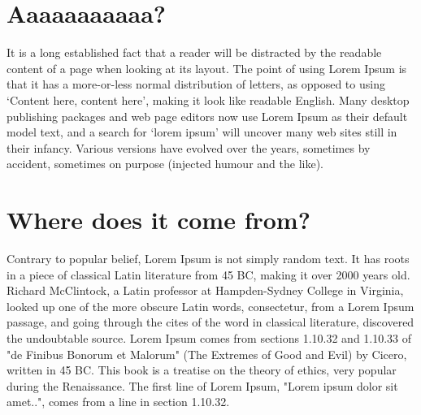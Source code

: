 \nomenclature[g-p]{$\pi$}{ $\simeq 3.14\ldots$}                                             %


\section{Aaaaaaaaaaa?} %


It is a long established fact that a reader will be distracted by the readable content of a page when looking at its layout. The point of using Lorem Ipsum is that it has a more-or-less normal distribution of letters, as opposed to using `Content here, content here', making it look like readable English. Many desktop publishing packages and web page editors now use Lorem Ipsum as their default model text, and a search for `lorem ipsum' will uncover many web sites still in their infancy. Various versions have evolved over the years, sometimes by accident, sometimes on purpose (injected humour and the like).

\section{Where does it come from?}  %
\label{section1.3}

Contrary to popular belief, Lorem Ipsum is not simply random text. It has roots in a piece of classical Latin literature from 45 BC, making it over 2000 years old. Richard McClintock, a Latin professor at Hampden-Sydney College in Virginia, looked up one of the more obscure Latin words, consectetur, from a Lorem Ipsum passage, and going through the cites of the word in classical literature, discovered the undoubtable source. Lorem Ipsum comes from sections 1.10.32 and 1.10.33 of "de Finibus Bonorum et Malorum" (The Extremes of Good and Evil) by Cicero, written in 45 BC. This book is a treatise on the theory of ethics, very popular during the Renaissance. The first line of Lorem Ipsum, "Lorem ipsum dolor sit amet..", comes from a line in section 1.10.32.

